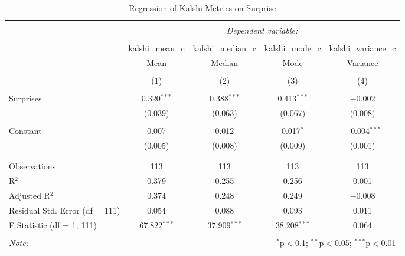 
\begin{table}[!htbp] \centering 
  \caption{Regression of Kalshi Metrics on Surprise} 
  \label{} 
\begin{tabular}{@{\extracolsep{5pt}}lcccc} 
\\[-1.8ex]\hline 
\hline \\[-1.8ex] 
 & \multicolumn{4}{c}{\textit{Dependent variable:}} \\ 
\cline{2-5} 
\\[-1.8ex] & kalshi\_mean\_c & kalshi\_median\_c & kalshi\_mode\_c & kalshi\_variance\_c \\ 
 & Mean & Median & Mode & Variance \\ 
\\[-1.8ex] & (1) & (2) & (3) & (4)\\ 
\hline \\[-1.8ex] 
 Surprises & 0.320$^{***}$ & 0.388$^{***}$ & 0.413$^{***}$ & $-$0.002 \\ 
  & (0.039) & (0.063) & (0.067) & (0.008) \\ 
  & & & & \\ 
 Constant & 0.007 & 0.012 & 0.017$^{*}$ & $-$0.004$^{***}$ \\ 
  & (0.005) & (0.008) & (0.009) & (0.001) \\ 
  & & & & \\ 
\hline \\[-1.8ex] 
Observations & 113 & 113 & 113 & 113 \\ 
R$^{2}$ & 0.379 & 0.255 & 0.256 & 0.001 \\ 
Adjusted R$^{2}$ & 0.374 & 0.248 & 0.249 & $-$0.008 \\ 
Residual Std. Error (df = 111) & 0.054 & 0.088 & 0.093 & 0.011 \\ 
F Statistic (df = 1; 111) & 67.822$^{***}$ & 37.909$^{***}$ & 38.208$^{***}$ & 0.064 \\ 
\hline 
\hline \\[-1.8ex] 
\textit{Note:}  & \multicolumn{4}{r}{$^{*}$p$<$0.1; $^{**}$p$<$0.05; $^{***}$p$<$0.01} \\ 
\end{tabular} 
\end{table} 
